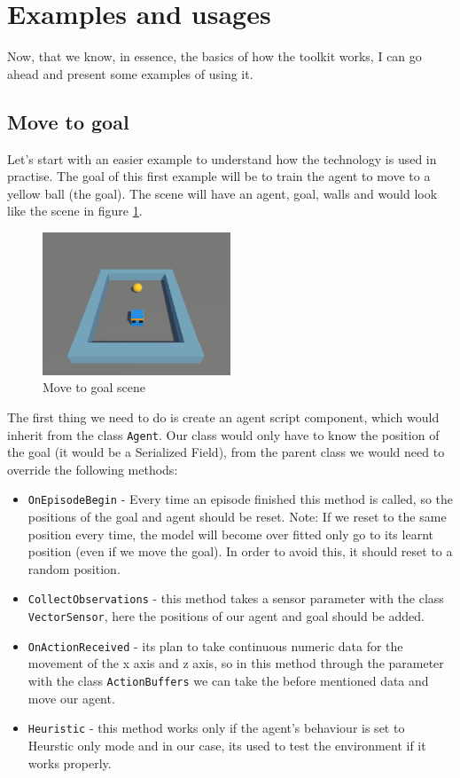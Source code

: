 \documentclass[a4paper, 12pt]{book}
\begin{document}
\section{Examples and usages}

Now, that we know, in essence, the basics of how the toolkit works, I can go ahead and present some examples of using it.

\subsection{Move to goal}

Let's start with an easier example to understand how the technology is used in practise. The goal of this first example will be to train the agent to move to a yellow ball (the goal). The scene will have an agent, goal, walls and would look like the scene in figure \ref{pic8}. 

\begin{figure}[h]
\begin{center}
\includegraphics[width=0.5\textwidth]{Images/MoveToGoal.png}
\end{center}
\caption{Move to goal scene}
\label{pic8}
\end{figure}

The first thing we need to do is create an agent script component, which would inherit from the class \texttt{Agent}. Our class would only have to know the position of the goal (it would be a Serialized Field), from the parent class we would need to override the following methods:
\begin{itemize}
    \item \texttt{OnEpisodeBegin} - Every time an episode finished this method is called, so the positions of the goal and agent should be reset. Note: If we reset to the same position every time, the model will become over fitted only go to its learnt position (even if we move the goal). In order to avoid this, it should reset to a random position.
    \item \texttt{CollectObservations} - this method takes a sensor parameter with the class \texttt{VectorSensor}, here the positions of our agent and goal should be added.
    \item \texttt{OnActionReceived} - its plan to take continuous numeric data for the movement of the x axis and z axis, so in this method through the parameter with the class \texttt{ActionBuffers} we can take the before mentioned data and move our agent.
    \item \texttt{Heuristic} - this method works only if the agent's behaviour is set to Heurstic only mode and in our case, its used to test the environment if it works properly.
\end{itemize}
\end{document}

